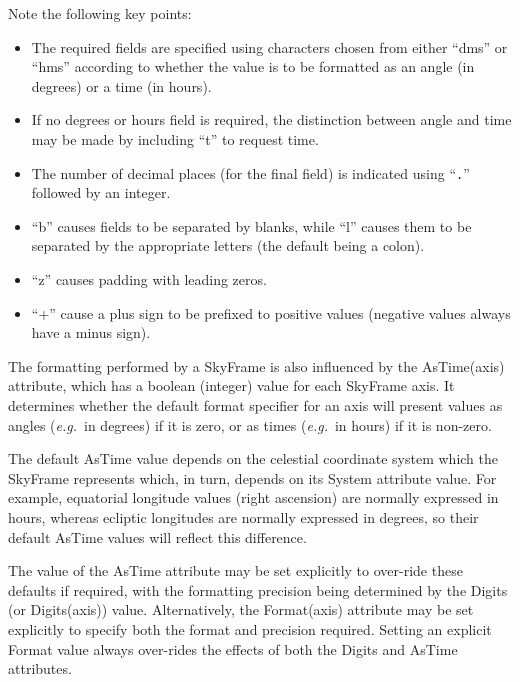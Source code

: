 \documentclass[twoside,11pt]{article}
\newcommand{\htmlref}[2]{#1}
\begin{document}
Note the following key points:

\begin{itemize}
\item The required fields are specified using characters chosen from
either ``dms'' or ``hms'' according to whether the value is to be
formatted as an angle (in degrees) or a time (in hours).

\item If no degrees or hours field is required, the distinction
between angle and time may be made by including ``t'' to request time.

\item The number of decimal places (for the final field) is indicated
using ``{\tt{.}}'' followed by an integer.

\item ``b'' causes fields to be separated by blanks, while ``l''
causes them to be separated by the appropriate letters (the default
being a colon).

\item ``z'' causes padding with leading zeros.

\item ``+'' cause a plus sign to be prefixed to positive values
(negative values always have a minus sign).
\end{itemize}

The formatting performed by a SkyFrame is also influenced by the
\htmlref{AsTime(axis)}{AsTimeaxis} attribute, which has a boolean (integer) value for each
SkyFrame axis.  It determines whether the default format specifier for
an axis will present values as angles ({\em{e.g.}}\ in degrees) if it
is zero, or as times ({\em{e.g.}}\ in hours) if it is non-zero.

The default AsTime value depends on the celestial coordinate system
which the SkyFrame represents which, in turn, depends on its \htmlref{System}{System}
attribute value. For example, equatorial longitude values (right
ascension) are normally expressed in hours, whereas ecliptic
longitudes are normally expressed in degrees, so their default AsTime
values will reflect this difference.

The value of the AsTime attribute may be set explicitly to over-ride
these defaults if required, with the formatting precision being
determined by the Digits (or Digits(axis)) value. Alternatively, the
Format(axis) attribute may be set explicitly to specify both the
format and precision required. Setting an explicit Format value always
over-rides the effects of both the Digits and AsTime attributes.
\end{document}
